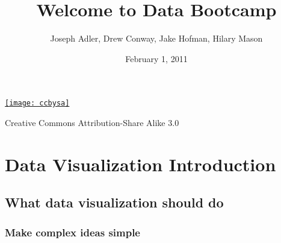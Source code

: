 \documentclass[xcolor=dvipsnames, 9pt]{beamer}
\title{Welcome to Data Bootcamp}
\author{Joseph Adler, Drew Conway, Jake Hofman, Hilary Mason}
\date{February 1, 2011}
\begin{document}
 
    
\begin{frame}[plain]
  \titlepage 

  \tiny
  \href{http://creativecommons.org/licenses/by-sa/3.0/us/}{\texttt{[image: ccbysa]}}

  Creative Commons Attribution-Share Alike 3.0
\end{frame}    

\section{Data Visualization Introduction} %
\label{sec:visualization}

\subsection{What data visualization should do} %
\label{sub:what_data_visualization_should_do}

{
\begin{frame}[fragile]
    \frametitle{}
    \vspace{4cm}
    \begin{center}
        \begin{minipage}{5cm}
    \end{minipage}
    \end{center}
\end{frame}
}

\begin{frame}[fragile]
    \frametitle{Make complex ideas \textbf{simple}}
    \begin{center}
    \end{center}
\end{frame}
\end{document}
